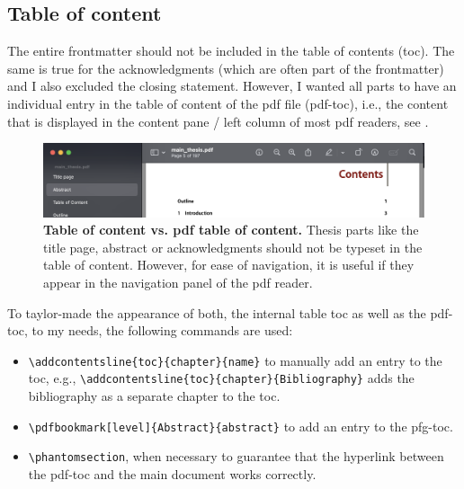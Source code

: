 \subsection{Table of content}
The entire frontmatter should not be included in the table of contents (toc). The same is true for the acknowledgments (which are often part of the frontmatter) and I also excluded the closing statement.
However, I wanted all parts to have an individual entry in the table of content of the pdf file (pdf-toc), i.e., the content that is displayed in the content pane / left column of most pdf readers, see .

\begin{figure}
	\includegraphics[width = \textwidth]{pdf-toc.png}
	\caption{\textbf{Table of content vs. pdf table of content.} Thesis parts like the title page, abstract or acknowledgments should not be typeset in the table of content. However, for ease of navigation, it is useful if they appear in the navigation panel of the pdf reader.}
	\label{fig:pdf-toc}
\end{figure}

To taylor-made the appearance of both, the internal table toc as well as the pdf-toc, to my needs, the following commands are used: 
\begin{itemize}
	\item \verb|\addcontentsline{toc}{chapter}{name}| to manually add an entry to the toc, e.g., \verb|\addcontentsline{toc}{chapter}{Bibliography}| adds the bibliography as a separate chapter to the toc.
	\item \verb|\pdfbookmark[level]{Abstract}{abstract}| to add an entry to the pfg-toc.
	\item \verb|\phantomsection|, when necessary to guarantee that the hyperlink between the pdf-toc and the main document works correctly.
\end{itemize}


